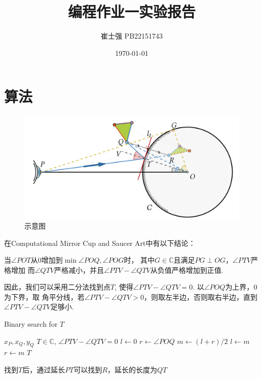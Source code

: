 \documentclass[UTF8]{ctexart}
\title{编程作业一实验报告}
\author{崔士强 PB22151743}
\date{\today}
\begin{document}
\maketitle
\section{算法}

\begin{figure}[h]
  \centering
  \includegraphics[scale=0.15]{pic.png}
  \caption{示意图}
\end{figure}

在Computational Mirror Cup and Saucer Art中有以下结论：

当$\angle POT$从$0$增加到$\min{\angle POQ, \angle POG}$时，
其中$G \in \mathbb{C}$且满足$PG \perp OG$，$\angle PTV$严格增加
而$\angle QTV$严格减小，并且$\angle PTV - \angle QTV$从负值严格增加到正值.

因此，我们可以采用二分法找到点$T$, 使得$\angle PTV - \angle QTV = 0$. 以$\angle POQ$为上界，$0$为下界，取
角平分线，若$\angle PTV - \angle QTV > 0$，则取左半边，否则取右半边，直到$\angle PTV - \angle QTV$足够小.

\begin{algorithm}[H]
  \caption{Binary search for $T$}
  \begin{algorithmic}[1]
    \Require
      $x_P, x_Q, y_Q$
    \Ensure
      $T \in \mathbb{C}$, $\angle PTV - \angle QTV = 0$
    \State $l \gets 0$
    \State $r \gets \angle POQ$
      \State $m \gets (l + r) / 2$
        \State $l \gets m$
      \Else
        \State $r \gets m$
      \EndIf
    \EndWhile
    \State \Return $T$
  \end{algorithmic}
\end{algorithm}

找到$T$后，通过延长$PT$可以找到$R$，延长的长度为$QT$
\end{document}

